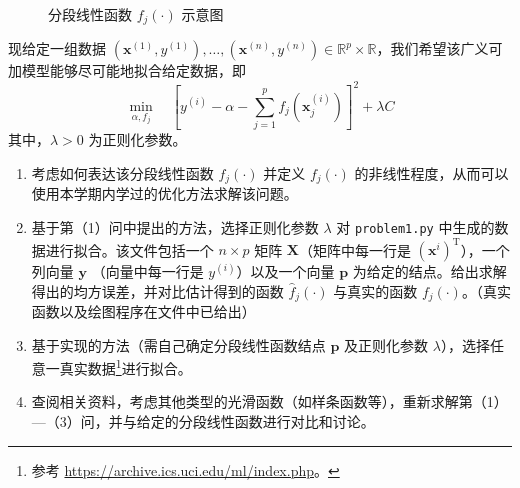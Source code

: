 \documentclass[cn,12pt,mtpro2]{elegantpaper}
\begin{document}
\begin{figure}[htp]
    \centering
    \caption{分段线性函数 $f_{j}(\cdot)$ 示意图}
    \label{figure:piecewise-affine-function}
\end{figure}
现给定一组数据 $(\mathbf{x}^{(1)},y^{(1)}),\ldots,(\mathbf{x}^{(n)},y^{(n)})\in\mathbb{R}^{p}\times\mathbb{R}$，我们希望该广义可加模型能够尽可能地拟合给定数据，即
\begin{equation}
    \min_{\alpha,f_{j}}\quad\left[y^{(i)}-\alpha-\sum_{j=1}^{p}f_{j}(\mathbf{x}^{(i)}_{j})\right]^{2}+\lambda C
\end{equation}
其中，$\lambda>0$ 为正则化参数。

\begin{enumerate}
    \item 考虑如何表达该分段线性函数 $f_{j}(\cdot)$ 并定义 $f_{j}(\cdot)$ 的非线性程度，从而可以使用本学期内学过的优化方法求解该问题。
    \item 基于第（1）问中提出的方法，选择正则化参数 $\lambda$ 对 \texttt{problem1.py} 中生成的数据进行拟合。该文件包括一个 $n\times p$ 矩阵 $\mathbf{X}$（矩阵中每一行是 $(\mathbf{x}^{i})^{\mathrm{T}}$），一个列向量 $\mathbf{y}$ （向量中每一行是 $y^{(i)}$）以及一个向量 $\mathbf{p}$ 为给定的结点。给出求解得出的均方误差，并对比估计得到的函数 $\hat{f}_{j}(\cdot)$ 与真实的函数 $f_{j}(\cdot)$。（真实函数以及绘图程序在文件中已给出）
    \item 基于实现的方法（需自己确定分段线性函数结点 $\mathbf{p}$ 及正则化参数 $\lambda$），选择任意一真实数据\footnote{参考 \url{https://archive.ics.uci.edu/ml/index.php}。}进行拟合。
    \item 查阅相关资料，考虑其他类型的光滑函数（如样条函数等），重新求解第（1）---（3）问，并与给定的分段线性函数进行对比和讨论。
\end{enumerate}
\end{document}
